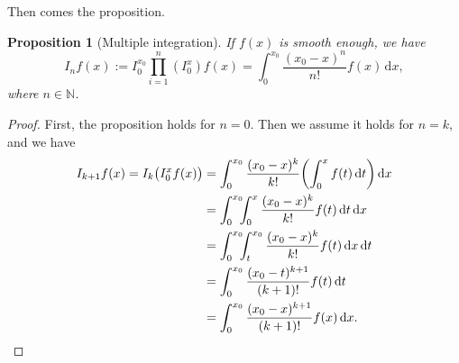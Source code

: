 \documentclass{article}
\newtheorem{prop}[lemma]{Proposition}
\begin{document}
Then comes the proposition.
\begin{prop}[Multiple integration]
  If $f(x)$ is smooth enough, we have
  \begin{equation}
    I_n f(x) \mathrel{:=}
    I_0^{x_0} \prod_{i = 1}^n (I_0^x) f(x) =
    \int_0^{x_0} \frac{(x_0 - x)^n}{n!} f(x) \, \mathrm{d} x,
  \end{equation}
  where $n \in \mathbb{N}$.
\end{prop}
\begin{proof}
  First, the proposition holds for $n = 0$.
  Then we assume it holds for $n = k$,
  and we have
  \[\begin{aligned}
    I_{k + 1} f(x) =
    I_k \bigl( I_0^x f(x) \bigr) &=
    \int_0^{x_0} \frac{(x_0 - x)^k}{k!}
    \biggl( \int_0^x f(t) \, \mathrm{d} t \biggr)
    \, \mathrm{d} x \\
    &= \int_0^{x_0} \!\!\! \int_0^x
    \frac{(x_0 - x)^k}{k!} f(t)
    \, \mathrm{d} t \, \mathrm{d} x \\
    &= \int_0^{x_0} \!\!\! \int_t^{x_0}
    \frac{(x_0 - x)^k}{k!} f(t)
    \, \mathrm{d} x \, \mathrm{d} t \\
    &= \int_0^{x_0}
    \frac{(x_0 - t)^{k + 1}}{(k + 1)!} f(t)
    \, \mathrm{d} t \\
    &= \int_0^{x_0}
    \frac{(x_0 - x)^{k + 1}}{(k + 1)!} f(x)
    \, \mathrm{d} x. \qedhere
  \end{aligned}\]
\end{proof}
\end{document}
